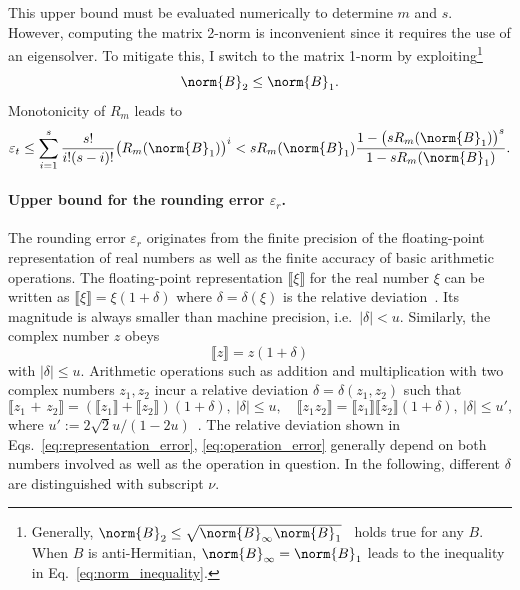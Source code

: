 This upper bound must be evaluated numerically to determine $m$ and $s$. However, computing the matrix 2-norm is inconvenient since it requires the use of an eigensolver. To mitigate this, I switch to the matrix 1-norm by exploiting\footnote{Generally, $\norm{B}_2\leq\sqrt{\norm{B}_\infty\norm{B}_1}$~\cite{wilkinson1994rounding} holds true for any $B$. When $B$ is anti-Hermitian, $\norm{B}_\infty=\norm{B}_1$ leads to the inequality in Eq.~\eqref{eq:norm_inequality}.}
\begin{equation}
\label{eq:norm_inequality}
    \norm{B}_2\leq\norm{B}_1.
\end{equation}
Monotonicity of $R_m$ leads to
\begin{equation}
    \label{eq:truncation}
    \varepsilon_t \leq 
    \sum_{i=1}^{s}\frac{s!}{i!(s-i)!}\big(R_m(\norm{B}_1)\big)^i
    < sR_m(\norm{B}_1)\frac{1-\big(sR_m(\norm{B}_1)\big)^s}{1-sR_m(\norm{B}_1)}.
\end{equation}


\paragraph{Upper bound for the rounding error \texorpdfstring{$\varepsilon_r$}{epsilon\_r}.}
\label{par:rounding_error}

The rounding error $\varepsilon_r$ originates from the finite precision of the floating-point representation of real numbers as well as the finite accuracy of basic arithmetic operations. The floating-point representation  $\llbracket \xi \rrbracket$ for the real number $\xi $ can be written as $\llbracket \xi \rrbracket=\xi(1+\delta)$ where $\delta=\delta(\xi)$ is the relative deviation~\cite{higham2002accuracy}. Its magnitude is always smaller than machine precision, i.e.\ $|\delta|<u$. Similarly, the complex number $z$ obeys 
\begin{equation}
    \label{eq:representation_error}
    \llbracket z\rrbracket=z(1+\delta)
\end{equation}
with $|\delta|\leq u$. Arithmetic operations such as addition and multiplication with two complex numbers $z_1, z_2$ incur a relative deviation $\delta=\delta(z_1,z_2)$ such that 
\begin{equation}
\label{eq:operation_error}
    \llbracket z_1 \text{ + } z_2\rrbracket =(\llbracket z_1 \rrbracket+\llbracket z_2\rrbracket)(1+\delta),\ |\delta|\leq u, \quad\llbracket z_1 z_2 \rrbracket=\llbracket z_1\rrbracket \llbracket z_2\rrbracket(1+\delta),\ |\delta|\leq u',
\end{equation}
where $u':=2\sqrt{2}u/(1-2u)$~\cite{higham2002accuracy}. The relative deviation shown in Eqs.~\eqref{eq:representation_error}, \eqref{eq:operation_error} generally depend on both numbers involved as well as the operation in question. In the following, different $\delta$ are distinguished with subscript $\nu$.

